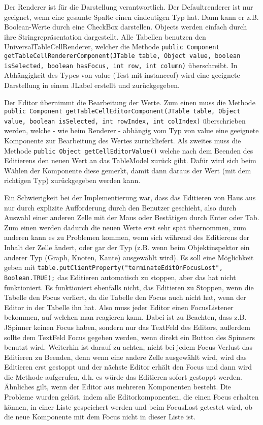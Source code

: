 Der Renderer ist für die Darstellung verantwortlich. Der Defaultrenderer ist nur geeignet, wenn eine gesamte Spalte einen eindeutigen Typ hat. Dann kann er z.B. Boolean-Werte durch eine CheckBox darstellen. Objects werden einfach durch ihre Stringrepräsentation dargestellt. Alle Tabellen benutzen den UniversalTableCellRenderer, welcher die Methode \lstinline{public Component getTableCellRendererComponent(JTable table, Object value, boolean isSelected, boolean hasFocus, int row, int column)} überschreibt. In Abhängigkeit des Types von value (Test mit instanceof) wird eine geeignete Darstellung in einem JLabel erstellt und zurückgegeben.

Der Editor übernimmt die Bearbeitung der Werte. Zum einen muss die Methode \lstinline{public Component getTableCellEditorComponent(JTable table, Object value, boolean isSelected, int rowIndex, int colIndex)} überschrieben werden, welche - wie beim Renderer - abhängig vom Typ von value eine geeignete Komponente zur Bearbeitung des Wertes zurückliefert. Als zweites muss die Methode \lstinline{public Object getCellEditorValue()} welche nach dem Beenden des Editierens den neuen Wert an das TableModel zurück gibt. Dafür wird sich beim Wählen der Komponente diese gemerkt, damit dann daraus der Wert (mit dem richtigen Typ) zurückgegeben werden kann.

Ein Schwierigkeit bei der Implementierung war, dass das Editieren von Haus aus nur durch explizite Aufforderung durch den Benutzer geschieht, also durch Auswahl einer anderen Zelle mit der Maus oder Bestätigen durch Enter oder Tab. Zum einen werden dadurch die neuen Werte erst sehr spät übernommen, zum anderen kann es zu Problemen kommen, wenn sich während des Editierens der Inhalt der Zelle ändert, oder gar der Typ (z.B. wenn beim Objektinspektor ein anderer Typ (Graph, Knoten, Kante) ausgewählt wird). Es soll eine Möglichkeit geben mit \lstinline{table.putClientProperty("terminateEditOnFocusLost", Boolean.TRUE);} das Editieren automatisch zu stoppen, aber das hat nicht funktioniert. Es funktioniert ebenfalls nicht, das Editieren zu Stoppen, wenn die Tabelle den Focus verliert, da die Tabelle den Focus auch nicht hat, wenn der Editor in der Tabelle ihn hat. Also muss jeder Editor einen FocusListener bekommen, auf welchen man reagieren kann. Dabei ist zu Beachten, dass z.B. JSpinner keinen Focus haben, sondern nur das TextFeld des Editors, außerdem sollte dem TextFeld Focus gegeben werden, wenn direkt ein Button des Spinners benutzt wird. Weiterhin ist darauf zu achten, nicht bei jedem Focus-Verlust das Editieren zu Beenden, denn wenn eine andere Zelle ausgewählt wird, wird das Editieren erst gestoppt und der nächste Editor erhält den Focus und dann wird die Methode aufgerufen, d.h. es würde das Editieren sofort gestoppt werden. Ähnliches gilt, wenn der Editor aus mehreren Komponenten besteht. Die Probleme wurden gelöst, indem alle Editorkomponenten, die einen Focus erhalten können, in einer Liste gespeichert werden und beim FocusLost getestet wird, ob die neue Komponente mit dem Focus nicht in dieser Liste ist.

